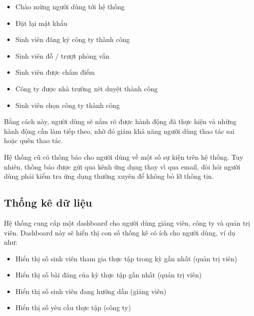 \documentclass[./../main.tex]{subfiles}
\begin{document}
\begin{itemize}
\item
  
  Chào mừng người dùng tới hệ thống
  
\item
  
  Đặt lại mật khẩu
  
\item
  
  Sinh viên đăng ký công ty thành công
  
\item
  
  Sinh viên đỗ / trượt phỏng vấn
  
\item
  
  Sinh viên được chấm điểm
  
\item
  
  Công ty được nhà trường xét duyệt thành công
  
\item
  
  Sinh viên chọn công ty thành công
  
\end{itemize}

Bằng cách này, người dùng sẽ nắm rõ được hành động đã thực hiện và những
hành động cần làm tiếp theo, nhờ đó giảm khả năng người dùng thao tác
sai hoặc quên thao tác.

Hệ thống cũ có thông báo cho người dùng về một số sự kiện trên hệ thống.
Tuy nhiên, thông báo được gửi qua kênh ứng dụng thay vì qua email, đòi
hỏi người dùng phải kiểm tra ứng dụng thường xuyên để không bỏ lỡ thông
tin.

\hypertarget{thux1ed1ng-kuxea-dux1eef-liux1ec7u}{%
\subsection{Thống kê dữ
liệu}\label{thux1ed1ng-kuxea-dux1eef-liux1ec7u}}

Hệ thống cung cấp một dashboard cho người dùng giảng viên, công ty và
quản trị viên. Dashboard này sẽ hiển thị con số thống kê có ích cho
người dùng, ví dụ như:

\begin{itemize}
\item
  
  Hiển thị số sinh viên tham gia thực tập trong kỳ gần nhất (quản trị
  viên)
  
\item
  
  Hiển thị số bài đăng của kỳ thực tập gần nhất (quản trị viên)
  
\item
  
  Hiển thị số sinh viên đang hướng dẫn (giảng viên)
  
\item
  
  Hiển thị số yêu cầu thực tập (công ty)
  
\end{itemize}
\end{document}

